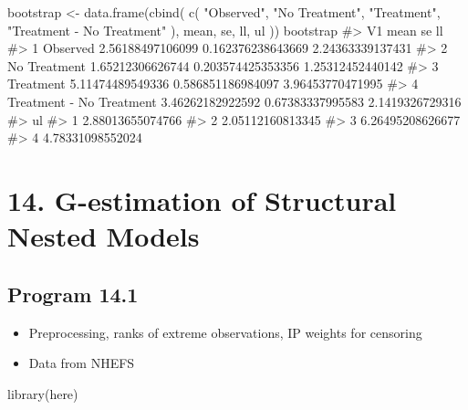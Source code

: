 \documentclass[
  10pt,
  a4paper,
]{book}
\newenvironment{Shaded}{\begin{snugshade}}{\end{snugshade}}
\newcommand{\CommentTok}[1]{\textcolor[rgb]{0.37,0.37,0.37}{#1}}
\newcommand{\FunctionTok}[1]{\textcolor[rgb]{0.28,0.35,0.67}{#1}}
\newcommand{\NormalTok}[1]{\textcolor[rgb]{0.00,0.46,0.62}{#1}}
\newcommand{\OtherTok}[1]{\textcolor[rgb]{0.00,0.46,0.62}{#1}}
\newcommand{\StringTok}[1]{\textcolor[rgb]{0.13,0.47,0.30}{#1}}
\providecommand{\tightlist}{%
  \setlength{\itemsep}{0pt}\setlength{\parskip}{0pt}}
\begin{document}
\begin{Shaded}
\begin{Highlighting}[]
\NormalTok{bootstrap }\OtherTok{\textless{}{-}}
  \FunctionTok{data.frame}\NormalTok{(}\FunctionTok{cbind}\NormalTok{(}
    \FunctionTok{c}\NormalTok{(}
      \StringTok{"Observed"}\NormalTok{,}
      \StringTok{"No Treatment"}\NormalTok{,}
      \StringTok{"Treatment"}\NormalTok{,}
      \StringTok{"Treatment {-} No Treatment"}
\NormalTok{    ),}
\NormalTok{    mean,}
\NormalTok{    se,}
\NormalTok{    ll,}
\NormalTok{    ul}
\NormalTok{  ))}
\NormalTok{bootstrap}
\CommentTok{\#\textgreater{}                         V1             mean                se               ll}
\CommentTok{\#\textgreater{} 1                 Observed 2.56188497106099 0.162376238643669 2.24363339137431}
\CommentTok{\#\textgreater{} 2             No Treatment 1.65212306626744 0.203574425353356 1.25312452440142}
\CommentTok{\#\textgreater{} 3                Treatment 5.11474489549336 0.586851186984097 3.96453770471995}
\CommentTok{\#\textgreater{} 4 Treatment {-} No Treatment 3.46262182922592  0.67383337995583  2.1419326729316}
\CommentTok{\#\textgreater{}                 ul}
\CommentTok{\#\textgreater{} 1 2.88013655074766}
\CommentTok{\#\textgreater{} 2 2.05112160813345}
\CommentTok{\#\textgreater{} 3 6.26495208626677}
\CommentTok{\#\textgreater{} 4 4.78331098552024}
\end{Highlighting}
\end{Shaded}

\chapter*{14. G-estimation of Structural Nested Models}\label{g-estimation-of-structural-nested-models}

\section{Program 14.1}\label{program-14.1}

\begin{itemize}
\tightlist
\item
  Preprocessing, ranks of extreme observations, IP weights for censoring
\item
  Data from NHEFS
\end{itemize}

\begin{Shaded}
\begin{Highlighting}[]
\FunctionTok{library}\NormalTok{(here)}
\end{Highlighting}
\end{Shaded}
\end{document}
